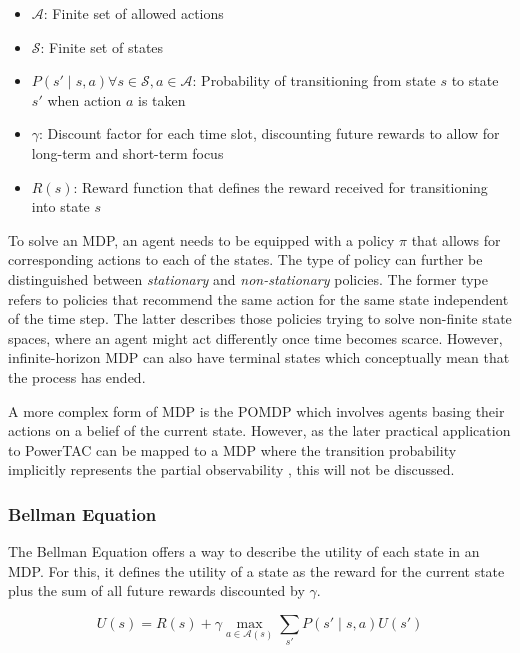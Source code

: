 \begin{itemize}
    \item $\mathcal{A}$: Finite set of allowed actions
    \item $\mathcal{S}$: Finite set of states
    \item $P(s' \mid s,a) \forall s \in \mathcal{S}, a \in \mathcal{A}$: Probability of transitioning from state
        $s$ to state $s'$ when action $a$ is taken
    \item $\gamma$: Discount factor for each time slot, discounting future rewards to allow for long-term and
        short-term focus
    \item $R(s)$: Reward function that defines the reward received for transitioning into state $s$
\end{itemize}

To solve an \ac{MDP}, an agent needs to be equipped with a policy $\pi$ that allows for corresponding actions to each
of the states. The type of policy can further be distinguished between \emph{stationary} and \emph{non-stationary}
policies. The former type refers to policies that recommend the same action for the same state independent of the
time step. The latter describes those policies trying to solve non-finite state spaces, where an
agent might act differently once time becomes scarce. However, infinite-horizon \ac{MDP} can also have
terminal states which conceptually mean that the process has ended.

A more complex form of \ac{MDP} is the \ac{POMDP} which involves agents basing their actions on a belief of the
current state. However, as the later practical application to \ac{PowerTAC} can be mapped to a \ac{MDP}
where the transition probability implicitly represents the partial observability \citep{tactexurieli2016mdp}, this will not be discussed.

\subsubsection{Bellman Equation}%
\label{ssub:bellman_equation}

The Bellman Equation offers a way to describe the utility of each state in an \ac{MDP}. For this, it defines the
utility of a state as the reward for the current state plus the sum of all future rewards discounted by $\gamma$.

\begin{equation}
    U(s) = R(s) + \gamma \max_{a\in\mathcal{A}(s)} \sum_{s'}{P(s' \mid s,a)U(s')}
\end{equation}

